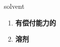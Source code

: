 
\begin{frame}
{\huge solvent}
\begin{center}
\begin{enumerate}\Large
  \item \textbf{有偿付能力的}
  \item \textbf{溶剂}
\end{enumerate}
\end{center}
\end{frame}
